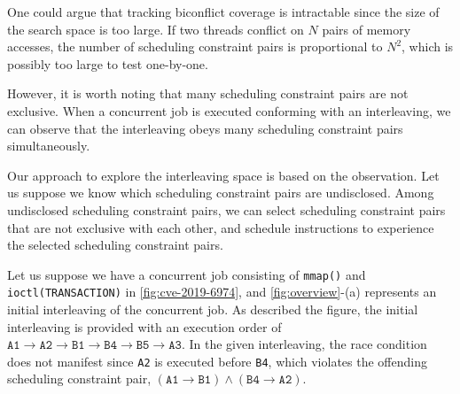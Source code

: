%
%
One could argue that tracking biconflict coverage is intractable since
the size of the search space is too large.
%
If two threads conflict on $N$ pairs of memory accesses, the number of
scheduling constraint pairs is proportional to $N^2$, which is possibly
too large to test one-by-one.

However, it is worth noting that many scheduling constraint pairs are
not exclusive.
%
When a concurrent job is executed conforming with an interleaving, we
can observe that the interleaving obeys many scheduling constraint
pairs simultaneously.
%

Our approach to explore the interleaving space is based on the
observation.
%
Let us suppose we know which scheduling constraint pairs are
undisclosed. Among undisclosed scheduling constraint pairs, we can
select scheduling constraint pairs that are not exclusive with each
other, and schedule instructions to experience the selected
scheduling constraint pairs.
%


%
Let us suppose we have a concurrent job consisting of \texttt{mmap()}
and \texttt{ioctl(TRANSACTION)} in \autoref{fig:cve-2019-6974}, and
\autoref{fig:overview}-(a) represents an initial interleaving of the
concurrent job.
%
As described the figure, the initial interleaving is provided with an
execution order of
$\texttt{A1} \rightarrow \texttt{A2} \rightarrow \texttt{B1}
\rightarrow \texttt{B4} \rightarrow \texttt{B5} \rightarrow
\texttt{A3}$.
%
In the given interleaving, the race condition does not manifest since
\texttt{A2} is executed before \texttt{B4}, which violates the
offending scheduling constraint pair,
$(\texttt{A1} \rightarrow \texttt{B1}) \wedge (\texttt{B4} \rightarrow
\texttt{A2})$.

